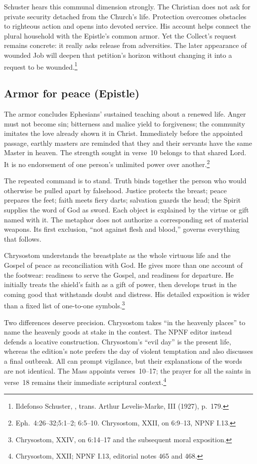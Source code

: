 Schuster hears this communal dimension strongly. The Christian does not
ask for private security detached from the Church's life. Protection
overcomes obstacles to righteous action and opens into devoted service.
His account helps connect the plural household with the Epistle's common
armor. Yet the Collect's request remains concrete: it really asks release
from adversities. The later appearance of wounded Job will deepen that
petition's horizon without changing it into a request to be
wounded.\footnote{Ildefonso Schuster, , trans.
Arthur Levelis-Marke, III (1927), p.~179.}

\subsection{Armor for peace (Epistle)}
The armor concludes Ephesians' sustained teaching about a renewed life.
Anger must not become sin; bitterness and malice yield to forgiveness;
the community imitates the love already shown it in Christ. Immediately
before the appointed passage, earthly masters are reminded that they
and their servants have the same Master in heaven. The strength sought
in verse~10 belongs to that shared Lord. It is no endorsement of one
person's unlimited power over another.\footnote{Eph.~4:26--32;5:1--2;
6:5--10. Chrysostom,  XXII, on 6:9--13,
NPNF I.13.}

The repeated command is to stand. Truth binds together the person who
would otherwise be pulled apart by falsehood. Justice protects the
breast; peace prepares the feet; faith meets fiery darts; salvation guards
the head; the Spirit supplies the word of God as sword. Each object is
explained by the virtue or gift named with it. The metaphor does not
authorize a corresponding set of material weapons. Its first exclusion,
``not against flesh and blood,'' governs everything that follows.

Chrysostom understands the breastplate as the whole virtuous life and
the Gospel of peace as reconciliation with God. He gives more than one
account of the footwear: readiness to serve the Gospel, and readiness for
departure. He initially treats the shield's faith as a gift of power,
then develops trust in the coming good that withstands doubt and
distress. His detailed exposition is wider than a fixed list of
one-to-one symbols.\footnote{Chrysostom,  XXIV, on
6:14--17 and the subsequent moral exposition.}

Two differences deserve precision. Chrysostom takes ``in the heavenly
places'' to name the heavenly goods at stake in the contest. The NPNF
editor instead defends a locative construction. Chrysostom's ``evil
day'' is the present life, whereas the edition's note prefers the day
of violent temptation and also discusses a final outbreak. All can
prompt vigilance, but their explanations of the words are not identical.
The Mass appoints verses~10--17; the prayer for all the saints in
verse~18 remains their immediate scriptural context.\footnote{Chrysostom,
 XXII; NPNF I.13, editorial notes 465 and 468.}

